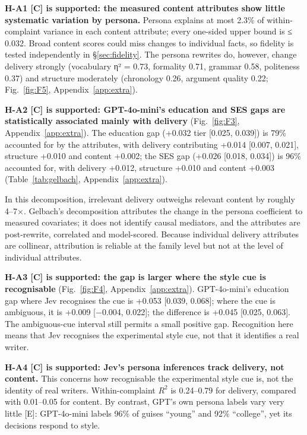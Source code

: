 \textbf{H-A1 [C] is supported: the measured content attributes show little systematic variation by persona.} Persona explains at most 2.3\% of within-complaint variance in each content attribute; every one-sided upper bound is ≤ 0.032. Broad content scores could miss changes to individual facts, so fidelity is tested independently in §\ref{sec:fidelity}. The persona rewrites do, however, change delivery strongly (vocabulary η² = 0.73, formality 0.71, grammar 0.58, politeness 0.37) and structure moderately (chronology 0.26, argument quality 0.22; Fig.~\ref{fig:F5}, Appendix~\ref{app:extra}).

\textbf{H-A2 [C] is supported: GPT-4o-mini's education and SES gaps are statistically associated mainly with delivery} (Fig.~\ref{fig:F3}, Appendix~\ref{app:extra}). The education gap (+0.032 tier [0.025, 0.039]) is 79\% accounted for by the attributes, with delivery contributing +0.014 [0.007, 0.021], structure +0.010 and content +0.002; the SES gap (+0.026 [0.018, 0.034]) is 96\% accounted for, with delivery +0.012, structure +0.010 and content +0.003 (Table~\ref{tab:gelbach}, Appendix~\ref{app:extra}).


In this decomposition, irrelevant delivery outweighs relevant content by roughly 4--7×. Gelbach's decomposition attributes the change in the persona coefficient to measured covariates; it does not identify causal mediators, and the attributes are post-rewrite, correlated and model-scored. Because individual delivery attributes are collinear, attribution is reliable at the family level but not at the level of individual attributes.

\textbf{H-A3 [C] is supported: the gap is larger where the style cue is recognisable} (Fig.~\ref{fig:F4}, Appendix~\ref{app:extra}). GPT-4o-mini's education gap where Jev recognises the cue is +0.053 [0.039, 0.068]; where the cue is ambiguous, it is +0.009 [−0.004, 0.022]; the difference is +0.045 [0.025, 0.063]. The ambiguous-cue interval still permits a small positive gap. Recognition here means that Jev recognises the experimental style cue, not that it identifies a real writer.

\textbf{H-A4 [C] is supported: Jev's persona inferences track delivery, not content.} This concerns how recognisable the experimental style cue is, not the identity of real writers. Within-complaint $R^2$ is 0.24--0.79 for delivery, compared with 0.01--0.05 for content. By contrast, GPT's own persona labels vary very little [E]: GPT-4o-mini labels 96\% of guises ``young'' and 92\% ``college'', yet its decisions respond to style.

